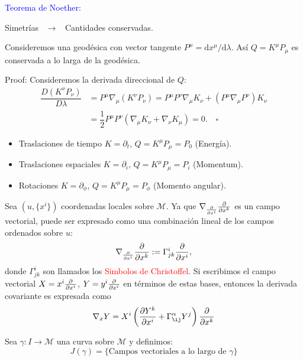 \documentclass[../main]{subfiles}
\begin{document}
\textcolor{blue}{Teorema de Noether:} 
\begin{center}
    Simetrías \ $\rightarrow$ \ Cantidades conservadas.
\end{center}

\proposicion{} Consideremos una geodésica con vector tangente $P^{\mu}=\mathrm{d}x^{\mu}/\mathrm{d}\lambda$. Así $Q=K^{\mu}P_{\mu}$ es conservada a lo larga de la geodésica.

Proof: Consideremos la derivada direccional de $Q$:
\begin{equation}
    \begin{split}
        \dfrac{D(K^{\nu}P_{\nu})}{D\lambda}&= P^{\mu}\nabla_{\mu}(K^{\nu}P_{\nu})=P^{\mu}P^{\nu}\nabla_{\mu}K_{\nu}+(P^{\mu}\nabla_{\mu}P^{\nu})K_{\nu}\\
        &=\dfrac{1}{2}P^{\mu}P^{\nu}(\nabla_{\mu}K_{\nu}+\nabla_{\nu}K_{\mu})=0. \quad \square
    \end{split}
\end{equation}

\ejemplo{}
\begin{itemize}
    \item Traslaciones de tiempo $K=\partial_t$, $Q=K^{\mu}P_{\mu}=P_0$ (Energía).
    \item Traslaciones espaciales $K=\partial_i$, $Q=K^{\mu}P_{\mu}=P_i$ (Momentum).
    \item Rotaciones $K=\partial_{\phi}$, $Q=K^{\mu}P_{\mu}=P_{\phi}$ (Momento angular).
\end{itemize}

Sea $(u, \{x^{i}\})$ coordenadas locales sobre $\mathcal{M}$. Ya que $\nabla_{\pdv{}{x^{i}}} \pdv{}{x^{k}}$ es un campo vectorial, puede ser expresado como una combinación lineal de los campos ordenados sobre $u$:
\begin{equation}
    \nabla_{\pdv{}{x^{i}}} \pdv{}{x^k}:= \Gamma^{i}_{jk} \pdv{}{x^{i}},
\end{equation}
donde $\Gamma^{i}_{jk}$ son llamados los \textcolor{red}{Simbolos de Christoffel}. Si escribimos el campo vectorial $X=x^{i}\pdv{}{x^{i}}$, $Y=y^{i}\pdv{}{x^{i}}$ en términos de estas bases, entonces la derivada covariante es expresada como 
\begin{equation}
    \nabla_x Y=X^{i}\left(\pdv{Y^k}{x^{i}}+\Gamma^{\alpha}_{\ij} Y^j\right)\pdv{}{x^k}
\end{equation}

Sea $\gamma: I \rightarrow \mathcal{M}$ una curva sobre $\mathcal{M}$ y definimos:
\begin{equation}
    J(\gamma)=\{ \text{Campos vectoriales a lo largo de } \gamma \}
\end{equation}
\end{document}
